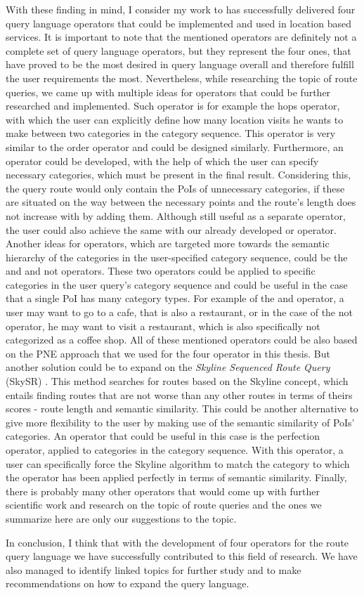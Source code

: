 With these finding in mind, I consider my work to has successfully delivered four query language operators that could be implemented and used in location based services. It is important to note that the mentioned operators are definitely not a complete set of query language operators, but they represent the four ones, that have proved to be the most desired in query language overall and therefore fulfill the user requirements the most. Nevertheless, while researching the topic of route queries, we came up with multiple ideas for operators that could be further researched and implemented. Such operator is for example the hops operator, with which the user can explicitly define how many location visits he wants to make between two categories in the category sequence. This operator is very similar to the order operator and could be designed similarly. Furthermore, an operator could be developed, with the help of which the user can specify necessary categories, which must be present in the final result. Considering this, the query route would only contain the PoIs of unnecessary categories, if these are situated on the way between the necessary points and the route's length does not increase with by adding them. Although still useful as a separate operator, the user could also achieve the same with our already developed or operator. \newline
Another ideas for operators, which are targeted more towards the semantic hierarchy of the categories in the user-specified category sequence, could be the and and not operators. These two operators could be applied to specific categories in the user query's category sequence and could be useful in the case that a single PoI has many category types. For example of the and operator, a user may want to go to a cafe, that is also a restaurant, or in the case of the not operator, he may want to visit a restaurant, which is also specifically not categorized as a coffee shop. \newline
All of these mentioned operators could be also based on the PNE approach that we used for the four operator in this thesis. But another solution could be to expand on the \textit{Skyline Sequenced Route Query} (SkySR) \cite{skyline}. This method searches for routes based on the Skyline concept, which entails finding routes that are not worse than any other routes in terms of theirs scores - route length and semantic similarity. This could be another alternative to give more flexibility to the user by making use of the semantic similarity of PoIs' categories. An operator that could be useful in this case is the perfection operator, applied to categories in the category sequence. With this operator, a user can specifically force the Skyline algorithm to match the category to which the operator has been applied perfectly in terms of semantic similarity. Finally, there is probably many other operators that would come up with further scientific work and research on the topic of route queries and the ones we summarize here are only our suggestions to the topic. 

In conclusion, I think that with the development of four operators for the route query language we have successfully contributed to this field of research. We have also managed to identify linked topics for further study and to make recommendations on how to expand the query language. 
